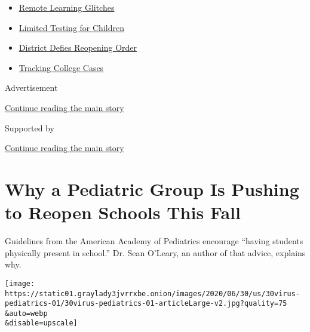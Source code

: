 \begin{itemize}
\tightlist
\item
  \href{https://www.nytimes3xbfgragh.onion/2020/09/08/us/school-districts-cyberattacks-glitches.html?name=styln-coronavirus-schools-reopening\&region=TOP_BANNER\&block=storyline_menu_recirc\&action=click\&pgtype=Article\&impression_id=920d1311-f4c0-11ea-9104-ef0fbb1bedd5\&variant=undefined}{Remote
  Learning Glitches}
\item
  \href{https://www.nytimes3xbfgragh.onion/2020/09/08/upshot/children-testing-shortfalls-virus.html?name=styln-coronavirus-schools-reopening\&region=TOP_BANNER\&block=storyline_menu_recirc\&action=click\&pgtype=Article\&impression_id=920d1312-f4c0-11ea-9104-ef0fbb1bedd5\&variant=undefined}{Limited
  Testing for Children}
\item
  \href{https://www.nytimes3xbfgragh.onion/2020/09/10/us/des-moines-school-opening-coronavirus.html?name=styln-coronavirus-schools-reopening\&region=TOP_BANNER\&block=storyline_menu_recirc\&action=click\&pgtype=Article\&impression_id=920d1313-f4c0-11ea-9104-ef0fbb1bedd5\&variant=undefined}{District
  Defies Reopening Order}
\item
  \href{https://www.nytimes3xbfgragh.onion/interactive/2020/us/covid-college-cases-tracker.html?name=styln-coronavirus-schools-reopening\&region=TOP_BANNER\&block=storyline_menu_recirc\&action=click\&pgtype=Article\&impression_id=920d1314-f4c0-11ea-9104-ef0fbb1bedd5\&variant=undefined}{Tracking
  College Cases}
\end{itemize}

Advertisement

\protect\hyperlink{after-top}{Continue reading the main story}

Supported by

\protect\hyperlink{after-sponsor}{Continue reading the main story}

\hypertarget{why-a-pediatric-group-is-pushing-to-reopen-schools-this-fall}{%
\section{Why a Pediatric Group Is Pushing to Reopen Schools This
Fall}\label{why-a-pediatric-group-is-pushing-to-reopen-schools-this-fall}}

Guidelines from the American Academy of Pediatrics encourage ``having
students physically present in school.'' Dr. Sean O'Leary, an author of
that advice, explains why.

\texttt{[image: https://static01.graylady3jvrrxbe.onion/images/2020/06/30/us/30virus-pediatrics-01/30virus-pediatrics-01-articleLarge-v2.jpg?quality=75\\\&auto=webp\\\&disable=upscale]}


